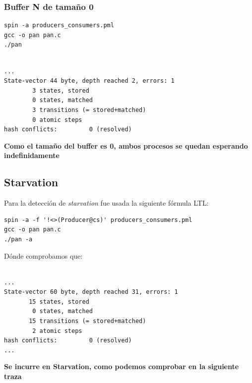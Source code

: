 \documentclass[a4paper,12pt]{article}
\begin{document}
\subsubsection{Buffer N de tamaño 0}

\begin{lstlisting}
spin -a producers_consumers.pml
gcc -o pan pan.c 
./pan
\end{lstlisting}

\begin{lstlisting}[frame=single]  % Start your code-block

...
State-vector 44 byte, depth reached 2, errors: 1
        3 states, stored
        0 states, matched
        3 transitions (= stored+matched)
        0 atomic steps
hash conflicts:         0 (resolved)
\end{lstlisting}
\textbf{Como el tamaño del buffer es 0, ambos procesos se quedan esperando indefinidamente}
\subsection{Starvation}

Para la detección de \textit{starvation} fue usada la siguiente fórmula LTL: 

\begin{lstlisting}
spin -a -f '!<>(Producer@cs)' producers_consumers.pml
gcc -o pan pan.c
./pan -a
\end{lstlisting}

Dónde comprobamos que:

\begin{lstlisting}[frame=single]  % Start your code-block

...
State-vector 60 byte, depth reached 31, errors: 1
       15 states, stored
        0 states, matched
       15 transitions (= stored+matched)
        2 atomic steps
hash conflicts:         0 (resolved)
...
\end{lstlisting}
\textbf{Se incurre en Starvation, como podemos comprobar en la siguiente traza}
\end{document}
